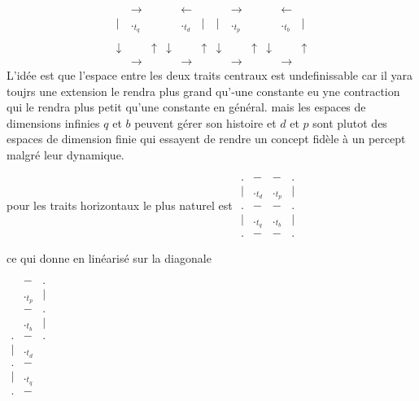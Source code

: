 \documentclass{article}
\begin{document}
$${\scriptscriptstyle\begin{array}{lcccclrccccr}
 & \rightarrow &   &   & \leftarrow &   &   & \rightarrow &   &   & \leftarrow &   \\
|                  &  ._{t_q} &             &                      &     ._{t_d}& |                & |                   &   ._{t_p}  &             &                       &   ._{t_b}  & | \\
                   &             &              &                       &                &                &                    &               &                &                      &                &   \\
\downarrow &            & \uparrow & \downarrow &                 & \uparrow & \downarrow &                & \uparrow & \downarrow &               & \uparrow \\
  &\rightarrow   &   &   &\rightarrow   &   &   & \rightarrow  &   &   &   \rightarrow&   
\end{array}}
$$
L'idée est que l'espace entre les deux traits centraux est undefinissable car il yara toujrs une extension le rendra plus grand qu'-une constante eu yne contraction qui le rendra plus petit qu'une constante en général. mais les espaces de dimensions infinies $q$ et $b$ peuvent gérer son histoire et $d$ et $p$ sont plutot des espaces de dimension finie qui essayent de rendre un concept fidèle à un percept malgré leur dynamique.
%

pour les traits horizontaux le plus naturel est 
$\begin{matrix} .&-&-&.\\
|&._{t_d}&._{t_p}&|\\
.&-&-&.\\
|&._{t_q}&._{t_b}&|\\
.&-&-&.
\end{matrix}$
 
 ce qui donne en linéarisé sur la diagonale
 
 $\begin{matrix} 
 &-&.\\
&._{t_p}&|\\
&-&.\\
&._{t_b}&|\\
.&-&.\\
|&._{t_d}&\\
.&-&\\
|&._{t_q}&\\
.&-&\\
\end{matrix}$
\end{document}
